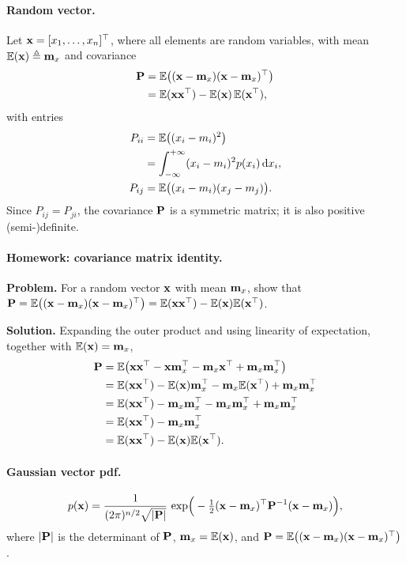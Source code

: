 \paragraph{Random vector.}
Let $\vect{x} = [x_1,\dots,x_n]\trans$, where all elements are random variables, with mean $\E(\vect{x})\triangleq\vect{m}_x$ and covariance
\begin{align}
\vect{P} &= \E\big((\vect{x}-\vect{m}_x)(\vect{x}-\vect{m}_x)\trans\big) \\
&= \E(\vect{x}\vect{x}\trans) - \E(\vect{x})\,\E(\vect{x}\trans),
\end{align}
with entries
\begin{align}
P_{ii} &= \E\big((x_i-m_i)^2\big) \\
&= \int_{-\infty}^{+\infty}(x_i-m_i)^2 p(x_i)\,\mathrm{d}x_i, \\
P_{ij} &= \E\big((x_i-m_i)(x_j-m_j)\big).
\end{align}
Since $P_{ij}=P_{ji}$, the covariance $\vect{P}$ is a symmetric matrix; it is also positive (semi-)definite.

\paragraph{Homework: covariance matrix identity.}
\textbf{Problem.} For a random vector $\vect{x}$ with mean $\vect{m}_x$, show that $\vect{P} = \E\big((\vect{x}-\vect{m}_x)(\vect{x}-\vect{m}_x)\trans\big) = \E(\vect{x}\vect{x}\trans) - \E(\vect{x})\E(\vect{x}\trans)$.

\textbf{Solution.} Expanding the outer product and using linearity of expectation, together with $\E(\vect{x})=\vect{m}_x$,
\begin{align}
\vect{P}
&= \E\big(\vect{x}\vect{x}\trans - \vect{x}\vect{m}_x\trans - \vect{m}_x\vect{x}\trans + \vect{m}_x\vect{m}_x\trans\big) \\
&= \E(\vect{x}\vect{x}\trans) - \E(\vect{x})\vect{m}_x\trans - \vect{m}_x\E(\vect{x}\trans) + \vect{m}_x\vect{m}_x\trans \\
&= \E(\vect{x}\vect{x}\trans) - \vect{m}_x\vect{m}_x\trans - \vect{m}_x\vect{m}_x\trans + \vect{m}_x\vect{m}_x\trans \\
&= \E(\vect{x}\vect{x}\trans) - \vect{m}_x\vect{m}_x\trans \\
&= \E(\vect{x}\vect{x}\trans) - \E(\vect{x})\E(\vect{x}\trans).
\end{align}

\paragraph{Gaussian vector pdf.}
\begin{align}
p(\vect{x}) = \frac{1}{(2\pi)^{n/2}\sqrt{|\vect{P}|}}\,\exp\!\Big(-\tfrac{1}{2}(\vect{x}-\vect{m}_x)\trans \vect{P}^{-1}(\vect{x}-\vect{m}_x)\Big),
\end{align}
where $|\vect{P}|$ is the determinant of $\vect{P}$, $\vect{m}_x=\E(\vect{x})$, and $\vect{P}=\E\big((\vect{x}-\vect{m}_x)(\vect{x}-\vect{m}_x)\trans\big)$.

